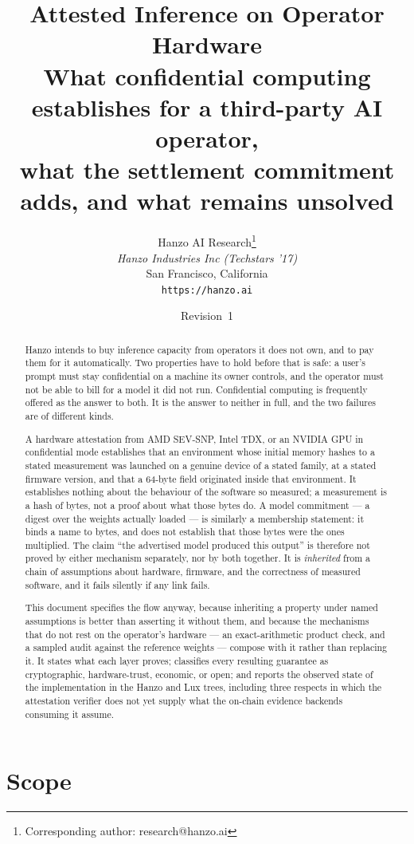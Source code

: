 \documentclass[11pt]{article}
\title{\textbf{Attested Inference on Operator Hardware}\\[2mm]
\large What confidential computing establishes for a third-party AI operator,\\
what the settlement commitment adds, and what remains unsolved}
\author{Hanzo AI Research\thanks{Corresponding author: research@hanzo.ai} \\
    \textit{Hanzo Industries Inc (Techstars '17)} \\
    San Francisco, California \\
    \texttt{https://hanzo.ai}}
\date{Revision~1}
\begin{document}
\maketitle

\begin{abstract}
Hanzo intends to buy inference capacity from operators it does not own, and to pay them for it
automatically. Two properties have to hold before that is safe: a user's prompt must stay
confidential on a machine its owner controls, and the operator must not be able to bill for a model
it did not run. Confidential computing is frequently offered as the answer to both. It is the answer
to neither in full, and the two failures are of different kinds.

A hardware attestation from AMD SEV-SNP, Intel TDX, or an NVIDIA GPU in confidential mode
establishes that an environment whose initial memory hashes to a stated measurement was launched on
a genuine device of a stated family, at a stated firmware version, and that a 64-byte field
originated inside that environment. It establishes nothing about the behaviour of the software so
measured; a measurement is a hash of bytes, not a proof about what those bytes do. A model
commitment --- a digest over the weights actually loaded --- is similarly a membership statement: it
binds a name to bytes, and does not establish that those bytes were the ones multiplied. The claim
``the advertised model produced this output'' is therefore not proved by either mechanism
separately, nor by both together. It is \emph{inherited} from a chain of assumptions about hardware,
firmware, and the correctness of measured software, and it fails silently if any link fails.

This document specifies the flow anyway, because inheriting a property under named assumptions is
better than asserting it without them, and because the mechanisms that do not rest on the operator's
hardware --- an exact-arithmetic product check, and a sampled audit against the reference weights
--- compose with it rather than replacing it. It states what each layer proves; classifies every
resulting guarantee as cryptographic, hardware-trust, economic, or open; and reports the observed
state of the implementation in the Hanzo and Lux trees, including three respects in which the
attestation verifier does not yet supply what the on-chain evidence backends consuming it assume.
\end{abstract}

\tableofcontents

\section{Scope}
\end{document}
